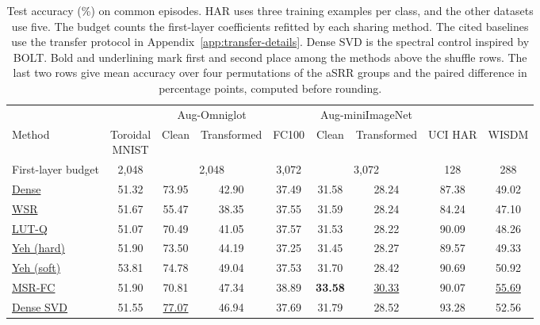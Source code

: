 \begin{table}[htbp]
\centering\small
\caption{Test accuracy (\%) on common episodes. HAR uses three training
examples per class, and the other datasets use five. The budget counts
the first-layer coefficients refitted by each sharing method. The cited
baselines use the transfer protocol in Appendix~\ref{app:transfer-details}.
Dense SVD is the spectral control inspired by BOLT. Bold and
underlining mark first and second place among the methods above the
shuffle rows. The last two rows give mean accuracy over four
permutations of the aSRR groups and the paired difference in
percentage points, computed before rounding.}
\label{tab:transfer-classification}
\setlength{\tabcolsep}{3pt}
\begin{tabular*}{\linewidth}{@{\extracolsep{\fill}}lcccccccc@{}}
\toprule
& & \multicolumn{2}{c}{Aug-Omniglot} & & \multicolumn{2}{c}{Aug-miniImageNet} & & \\
\cmidrule(lr){3-4}\cmidrule(lr){6-7}
Method & \shortstack{Toroidal\\MNIST} & Clean & Transformed & FC100 & Clean & Transformed & UCI HAR & WISDM \\
\midrule
First-layer budget & 2,048 & \multicolumn{2}{c}{2,048} & 3,072 & \multicolumn{2}{c}{3,072} & 128 & 288 \\
\midrule
\hyperref[sec:experiments]{Dense} & 51.32 & 73.95 & 42.90 & 37.49 & 31.58 & 28.24 & 87.38 & 49.02 \\
\href{https://proceedings.mlr.press/v238/shakerinava24a.html}{WSR}~\citep{shakerinava2024weight} & 51.67 & 55.47 & 38.35 & 37.55 & 31.59 & 28.24 & 84.24 & 47.10 \\
\href{https://arxiv.org/abs/1811.05355}{LUT-Q}~\citep{cardinaux2018iteratively} & 51.07 & 70.49 & 41.05 & 37.57 & 31.53 & 28.22 & 90.09 & 48.26 \\
\href{https://proceedings.mlr.press/v151/yeh22b.html}{Yeh (hard)}~\citep{yeh2022equivariance} & 51.90 & 73.50 & 44.19 & 37.25 & 31.45 & 28.27 & 89.57 & 49.33 \\
\href{https://proceedings.mlr.press/v151/yeh22b.html}{Yeh (soft)}~\citep{yeh2022equivariance} & 53.81 & 74.78 & 49.04 & 37.53 & 31.70 & 28.42 & 90.69 & 50.92 \\
\href{https://arxiv.org/abs/2007.02933}{MSR-FC}~\citep{zhou2021meta} & 51.90 & 70.81 & 47.34 & 38.89 & \textbf{33.58} & \underline{30.33} & 90.07 & \underline{55.69} \\
\hyperref[app:spectral-controls]{Dense SVD}~\citep{park2026bolt} & 51.55 & \underline{77.07} & 46.94 & 37.69 & 31.79 & 28.52 & 93.28 & 52.56 \\

\end{tabular*}
\end{table}
